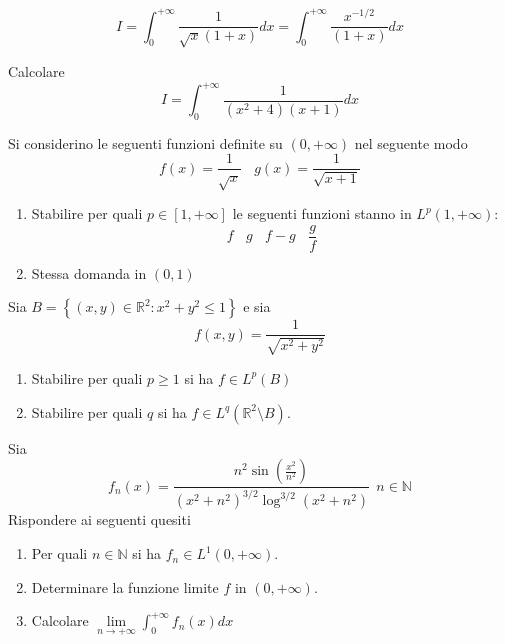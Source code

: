 \begin{equation*}
I=\int ^{+\infty }_{0}\frac{1}{\sqrt{x}\left( 1+x\right)} dx=\int ^{+\infty }_{0}\frac{x^{-1/2}}{\left( 1+x\right)} dx
\end{equation*}
\Esercizio{}

Calcolare
\begin{equation*}
I=\int ^{+\infty }_{0}\frac{1}{\left( x^{2} +4\right)\left( x+1\right)} dx
\end{equation*}

Si considerino le seguenti funzioni definite su $\left( 0,+\infty \right)$ nel seguente modo
\begin{equation*}
f\left( x\right) =\frac{1}{\sqrt{x}} \ \ \ \ g\left( x\right) =\frac{1}{\sqrt{x+1}}
\end{equation*}
\begin{enumerate}
\item Stabilire per quali $p\in \left[ 1,+\infty \right]$ le seguenti funzioni stanno in $L^{p}\left( 1,+\infty \right)$:\begin{equation*}
f\ \ \ \ g\ \ \ \ f-g\ \ \ \ \frac{g}{f}
\end{equation*}
\item Stessa domanda in $\left( 0,1\right)$
\end{enumerate}
\Esercizio{ }

Sia $B=\left\{\left( x,y\right) \in \mathbb{R}^{2} :x^{2} +y^{2} \leqslant 1\right\}$ e sia
\begin{equation*}
f\left( x,y\right) =\frac{1}{\sqrt{x^{2} +y^{2}}}
\end{equation*}
\begin{enumerate}
\item Stabilire per quali $p\geqslant 1$ si ha $f\in L^{p}\left( B\right)$
\item Stabilire per quali $q$ si ha $f\in L^{q}\left(\mathbb{R}^{2} \setminus B\right)$.
\end{enumerate}
\Esercizio{}

Sia
\begin{equation*}
f_{n}\left( x\right) =\frac{n^{2}\sin\left(\frac{x^{2}}{n^{2}}\right)}{\left( x^{2} +n^{2}\right)^{3/2}\log^{3/2}\left( x^{2} +n^{2}\right)} \ \ n\in \mathbb{N}
\end{equation*}
Rispondere ai seguenti quesiti
\begin{enumerate}
\item Per quali $n\in \mathbb{N}$ si ha $f_{n} \in L^{1}\left( 0,+\infty \right)$.
\item Determinare la funzione limite $f$ in $\left( 0,+\infty \right)$.
\item Calcolare $\lim\limits _{n\rightarrow +\infty }\int ^{+\infty }_{0} f_{n}\left( x\right) dx$
\end{enumerate}
\Esercizio{}

